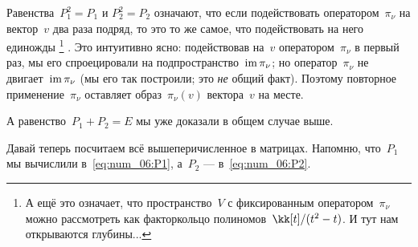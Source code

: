 \begin{solution}
	Равенства~$P_1^2 = P_1$ и $P_2^2 = P_2$ означают, что если подействовать оператором~$\pi_\nu$ на вектор~$v$ два раза подряд, то это то же самое, что подействовать на него единожды%
	\footnote{%
		А ещё это означает, что пространство~$V$ с фиксированным оператором~$\pi_\nu$ можно рассмотреть как факторкольцо полиномов~$\kk[t]/(t^2 - t)$. И тут нам открываются глубины...
	}%
	. Это интуитивно ясно: подействовав на~$v$ оператором~$\pi_\nu$ в первый раз, мы его спроецировали на подпространство~$\mathop{\mathrm{im}}\nolimits{\pi_\nu}$; но оператор~$\pi_\nu$ не двигает~$\mathop{\mathrm{im}}\nolimits{\pi_\nu}$ (мы его так построили; это \emph{не} общий факт). Поэтому повторное применение~$\pi_\nu$ оставляет образ~$\pi_\nu(v)$ вектора~$v$ на месте.

	А равенство~$P_1 + P_2 = E$ мы уже доказали в общем случае выше.

	Давай теперь посчитаем всё вышеперичисленное в матрицах. Напомню, что~$P_1$ мы вычислили в~\eqref{eq:num_06:P1}, а~$P_2$ --- в~\eqref{eq:num_06:P2}.


\end{solution}
